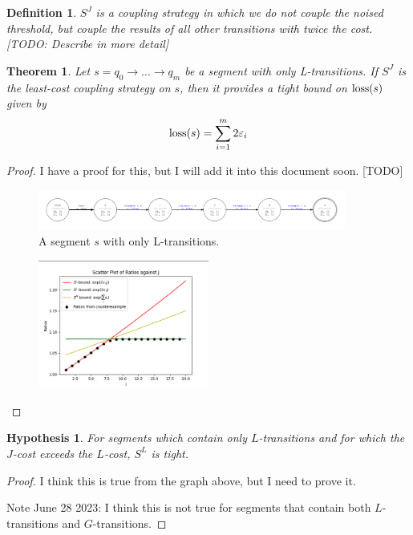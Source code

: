 \documentclass{article}
\newtheorem{theorem}{Theorem}
\newtheorem{hypothesis}{Hypothesis}[section]
\newtheorem{definition}{Definition}[section]
\renewcommand{\epsilon}{\varepsilon}
\newcommand{\loss}{\textup{loss}}
\newcommand{\1}{\langle 1 \rangle}
\newcommand{\2}{\langle 2 \rangle}
\begin{document}
\begin{definition}
    $S^J$ is a coupling strategy in which we do not couple the noised threshold, but couple the results of all other transitions with twice the cost. [TODO: Describe in more detail]
\end{definition}

\begin{theorem}
    Let $s = q_0 \to \dots \to q_m$ be a segment with only L-transitions. If $S^J$ is the least-cost coupling strategy on $s$, then it provides a tight bound on $\loss(s)$ given by \[\loss(s) = \sum_{i = 1}^{m} 2\epsilon_i\]
\end{theorem}

\begin{proof}
    I have a proof for this, but I will add it into this document soon. [TODO]

    \begin{figure}[H]
        \centering
        \includegraphics[width=0.9\textwidth]{figures/only_l_transitions.png}
        \caption{A segment $s$ with only L-transitions.}
        \label{fig:segment_j}
    \end{figure}

    \begin{figure}[H]
        \centering
        \includegraphics[width=0.5\textwidth]{figures/only_l_transitions_plot.png}
        \caption{}
        \label{fig:segment_j_coupling}
    \end{figure}
\end{proof}

\begin{hypothesis}
    For segments which contain only $L$-transitions and for which the $J$-cost exceeds the $L$-cost, $S^L$ is tight.
\end{hypothesis}

\begin{proof}
    I think this is true from the graph above, but I need to prove it.

    Note June 28 2023: I think this is not true for segments that contain both $L$-transitions and $G$-transitions.
\end{proof}
\end{document}
